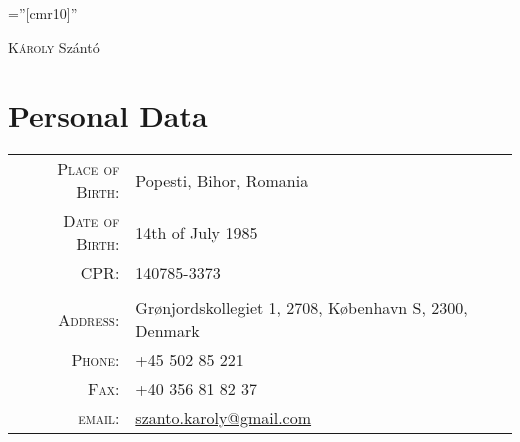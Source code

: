 \documentclass[a4paper,10pt]{article}
\begin{document}
\pagestyle{plain} %

\font\fb=''[cmr10]'' %

 
\par{\centering
		{\Huge \textsc{K\'aroly} Sz\'ant\'o
	}\bigskip\par}
	
\section{Personal Data}

\begin{tabular}{rl}
    \textsc{Place of Birth:} & Popesti, Bihor, Romania\\
    \textsc{Date of Birth:}  & 14th of July 1985 \\
    \textsc{CPR:} 			 & 140785-3373 \\ \\
    \textsc{Address:}   	 &  Grønjordskollegiet 1, 2708,
    København S, 2300, Denmark \\ 
    \textsc{Phone:}     	 & +45 502 85 221\\
    \textsc{Fax:}			 & +40 356 81 82 37\\
    \textsc{email:}     	 &
    \href{mailto:szanto.karoly@gmail.com}{szanto.karoly@gmail.com}
\end{tabular}

\end{document}

